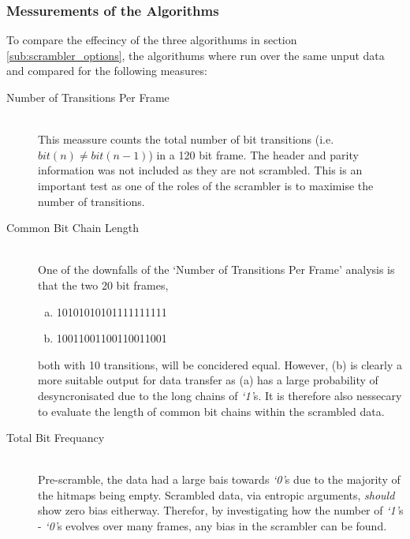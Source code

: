 		\subsubsection{Messurements of the Algorithms} 
		\label{subsub:messurements_of_the_algorithms}

			To compare the effecincy of the three algorithums in section \ref{sub:scrambler_options}, the algorithums where run over the same unput data and compared for the following measures:

			\begin{description}
				\item[Number of Transitions Per Frame] \hfill \\
					This meassure counts the total number of bit transitions (i.e. $bit(n) \neq bit(n-1)$) in a 120 bit frame. 
					The header and parity information was not included as they are not scrambled.
					This is an important test as one of the roles of the scrambler is to maximise the number of transitions.

				\item[Common Bit Chain Length] \hfill \\
					One of the downfalls of the `Number of Transitions Per Frame' analysis is that the two 20 bit frames,

					\begin{enumerate}[a)]
						\item 10101010101111111111
						\item 10011001100110011001
					\end{enumerate}

					both with 10 transitions, will be concidered equal. However, (b) is clearly a more suitable output for data transfer as (a) has a large probability of desyncronisated due to the long chains of \textit{`1'}s.
					It is therefore also nessecary to evaluate the length of common bit chains within the scrambled data. 

				\item[Total Bit Frequancy] \hfill \\
					Pre-scramble, the data had a large bais towards \textit{`0'}s due to the majority of the hitmaps being empty.
					Scrambled data, via entropic arguments, \textit{should} show zero bias eitherway.
					Therefor, by investigating how the number of \textit{`1'}s - \textit{`0'}s evolves over many frames, any bias in the scrambler can be found.

			\end{description}	

